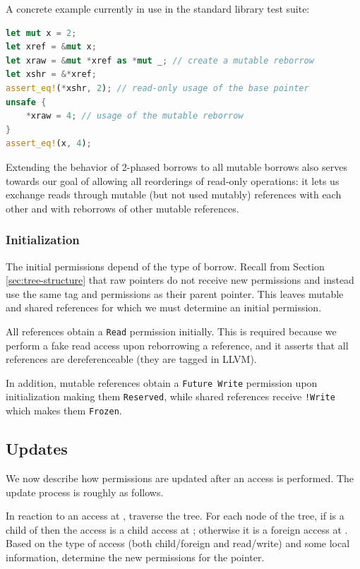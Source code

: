 \documentclass[a4paper,11pt]{article}
\theoremstyle{plain}
\theoremstyle{definition}
\theoremstyle{remark}
\newcommand{\tcode}[1]{\rstinline{#1}}
\newcommand{\tperm}[1]{\texttt{#1}}
\begin{document}
A concrete example currently in use in the standard library test suite:
\begin{lstlisting}[language=rust]
let mut x = 2;
let xref = &mut x;
let xraw = &mut *xref as *mut _; // create a mutable reborrow
let xshr = &*xref;
assert_eq!(*xshr, 2); // read-only usage of the base pointer
unsafe {
    *xraw = 4; // usage of the mutable reborrow
}
assert_eq!(x, 4);
\end{lstlisting}

Extending the behavior of 2-phased borrows to all mutable borrows also serves
towards our goal of allowing all reorderings of read-only operations: it lets
us exchange reads through mutable (but not used mutably) references with each
other and with reborrows of other mutable references.

\subsubsection{Initialization}

The initial permissions depend of the type of borrow.
Recall from Section \ref{sec:tree-structure} that raw pointers do not receive new permissions and instead
use the same tag and permissions as their parent pointer. This leaves mutable and
shared references for which we must determine an initial permission.

All references obtain a \tperm{Read} permission initially. This is required
because we perform a fake read access upon reborrowing a reference, and it asserts
that all references are dereferenceable (they are tagged \tcode{dereferenceable}
in LLVM).

In addition, mutable references obtain a \tperm{Future Write} permission upon initialization
making them \tperm{Reserved}, while shared references receive \tperm{!Write} which makes them \tperm{Frozen}.

\subsection{Updates}
\label{sec:transitions}

We now describe how permissions are updated after an access is performed.
The update process is roughly as follows.

In reaction to an access at \tcode{t0}, traverse the tree. For each \tcode{t1} node of the
tree, if \tcode{t0} is a child of \tcode{t1} then the access is a child access at \tcode{t1}; otherwise
it is a foreign access at \tcode{t1}. Based on the type of access (both child/foreign
and read/write) and some local information, determine the new permissions for the
pointer.
\end{document}
